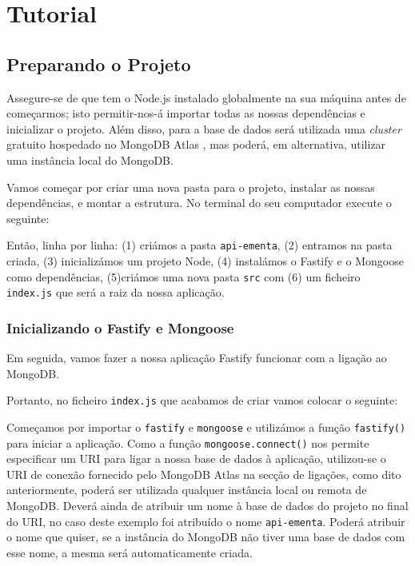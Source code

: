 \section{Tutorial} \label{section: tutorial}

\subsection{Preparando o Projeto} \label{section: tutorial project setup}

Assegure-se de que tem o Node.js instalado globalmente na sua máquina antes de começarmos; isto permitir-nos-á importar todas as nossas dependências e inicializar o projeto. Além disso, para a base de dados será utilizada uma \textit{cluster} gratuito hospedado no MongoDB Atlas \cite{noauthor_mongodb_nodate-1}, mas poderá, em alternativa, utilizar uma instância local do MongoDB.

Vamos começar por criar uma nova pasta para o projeto, instalar as nossas dependências, e montar a estrutura. No terminal do seu computador execute o seguinte:



Então, linha por linha: (1) criámos a pasta \texttt{api-ementa}, (2) entramos na pasta criada, (3) inicializámos um projeto Node, (4) instalámos o Fastify e o Mongoose como dependências, (5)criámos uma nova pasta \texttt{src} com (6) um ficheiro \texttt{index.js} que será a raiz da nossa aplicação.

\subsubsection{Inicializando o Fastify e Mongoose}

Em seguida, vamos fazer a nossa aplicação Fastify funcionar com a ligação ao MongoDB.

Portanto, no ficheiro \texttt{index.js} que acabamos de criar vamos colocar o seguinte:



Começamos por importar o \texttt{fastify} e \texttt{mongoose} e utilizámos a função \texttt{fastify()} para iniciar a aplicação. Como a função \texttt{mongoose.connect()} nos permite especificar um URI para ligar a nossa base de dados à aplicação, utilizou-se o URI de conexão fornecido pelo MongoDB Atlas na secção de ligações, como dito anteriormente, poderá ser utilizada qualquer instância local ou remota de MongoDB. Deverá ainda de atribuir um nome à base de dados do projeto no final do URI, no caso deste exemplo foi atribuído o nome \texttt{api-ementa}. Poderá atribuir o nome que quiser, se a instância do MongoDB não tiver uma base de dados com esse nome, a mesma será automaticamente criada.

